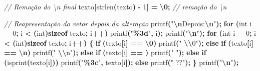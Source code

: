 \documentclass[
  11pt,
  a4paper,
]{scrbook}
\newenvironment{Shaded}{\begin{snugshade}}{\end{snugshade}}
\newcommand{\CharTok}[1]{\textcolor[rgb]{0.31,0.60,0.02}{#1}}
\newcommand{\CommentTok}[1]{\textcolor[rgb]{0.56,0.35,0.01}{\textit{#1}}}
\newcommand{\ControlFlowTok}[1]{\textcolor[rgb]{0.13,0.29,0.53}{\textbf{#1}}}
\newcommand{\DataTypeTok}[1]{\textcolor[rgb]{0.13,0.29,0.53}{#1}}
\newcommand{\DecValTok}[1]{\textcolor[rgb]{0.00,0.00,0.81}{#1}}
\newcommand{\KeywordTok}[1]{\textcolor[rgb]{0.13,0.29,0.53}{\textbf{#1}}}
\newcommand{\NormalTok}[1]{#1}
\newcommand{\OperatorTok}[1]{\textcolor[rgb]{0.81,0.36,0.00}{\textbf{#1}}}
\newcommand{\SpecialCharTok}[1]{\textcolor[rgb]{0.81,0.36,0.00}{\textbf{#1}}}
\newcommand{\StringTok}[1]{\textcolor[rgb]{0.31,0.60,0.02}{#1}}
\begin{document}
\begin{Shaded}
\begin{Highlighting}[]
    \CommentTok{// Remoção do \textbackslash{}n final}
\NormalTok{    texto}\OperatorTok{[}\NormalTok{strlen}\OperatorTok{(}\NormalTok{texto}\OperatorTok{)} \OperatorTok{{-}} \DecValTok{1}\OperatorTok{]} \OperatorTok{=} \CharTok{\textquotesingle{}}\SpecialCharTok{\textbackslash{}0}\CharTok{\textquotesingle{}}\OperatorTok{;}  \CommentTok{// remoção do \textbackslash{}n}

    \CommentTok{// Reapresentação do vetor depois da alteração}
\NormalTok{    printf}\OperatorTok{(}\StringTok{"}\SpecialCharTok{\textbackslash{}n}\StringTok{Depois:}\SpecialCharTok{\textbackslash{}n}\StringTok{"}\OperatorTok{);}
    \ControlFlowTok{for} \OperatorTok{(}\DataTypeTok{int}\NormalTok{ i }\OperatorTok{=} \DecValTok{0}\OperatorTok{;}\NormalTok{ i }\OperatorTok{\textless{}} \OperatorTok{(}\DataTypeTok{int}\OperatorTok{)}\KeywordTok{sizeof}\NormalTok{ texto}\OperatorTok{;}\NormalTok{ i}\OperatorTok{++)}
\NormalTok{        printf}\OperatorTok{(}\StringTok{"}\SpecialCharTok{\%3d}\StringTok{"}\OperatorTok{,}\NormalTok{ i}\OperatorTok{);}
\NormalTok{    printf}\OperatorTok{(}\StringTok{"}\SpecialCharTok{\textbackslash{}n}\StringTok{"}\OperatorTok{);}
    \ControlFlowTok{for} \OperatorTok{(}\DataTypeTok{int}\NormalTok{ i }\OperatorTok{=} \DecValTok{0}\OperatorTok{;}\NormalTok{ i }\OperatorTok{\textless{}} \OperatorTok{(}\DataTypeTok{int}\OperatorTok{)}\KeywordTok{sizeof}\NormalTok{ texto}\OperatorTok{;}\NormalTok{ i}\OperatorTok{++)} \OperatorTok{\{}
        \ControlFlowTok{if} \OperatorTok{(}\NormalTok{texto}\OperatorTok{[}\NormalTok{i}\OperatorTok{]} \OperatorTok{==} \CharTok{\textquotesingle{}}\SpecialCharTok{\textbackslash{}0}\CharTok{\textquotesingle{}}\OperatorTok{)}
\NormalTok{            printf}\OperatorTok{(}\StringTok{" }\SpecialCharTok{\textbackslash{}\textbackslash{}}\StringTok{0"}\OperatorTok{);}
        \ControlFlowTok{else} \ControlFlowTok{if} \OperatorTok{(}\NormalTok{texto}\OperatorTok{[}\NormalTok{i}\OperatorTok{]} \OperatorTok{==} \CharTok{\textquotesingle{}}\SpecialCharTok{\textbackslash{}n}\CharTok{\textquotesingle{}}\OperatorTok{)}
\NormalTok{            printf}\OperatorTok{(}\StringTok{" }\SpecialCharTok{\textbackslash{}\textbackslash{}}\StringTok{n"}\OperatorTok{);}
        \ControlFlowTok{else} \ControlFlowTok{if} \OperatorTok{(}\NormalTok{texto}\OperatorTok{[}\NormalTok{i}\OperatorTok{]} \OperatorTok{==} \CharTok{\textquotesingle{} \textquotesingle{}}\OperatorTok{)}
\NormalTok{            printf}\OperatorTok{(}\StringTok{"   "}\OperatorTok{);}
        \ControlFlowTok{else} \ControlFlowTok{if} \OperatorTok{(}\NormalTok{isprint}\OperatorTok{(}\NormalTok{texto}\OperatorTok{[}\NormalTok{i}\OperatorTok{]))}
\NormalTok{            printf}\OperatorTok{(}\StringTok{"}\SpecialCharTok{\%3c}\StringTok{"}\OperatorTok{,}\NormalTok{ texto}\OperatorTok{[}\NormalTok{i}\OperatorTok{]);}
        \ControlFlowTok{else}
\NormalTok{            printf}\OperatorTok{(}\StringTok{" ??"}\OperatorTok{);}
    \OperatorTok{\}}
\NormalTok{    printf}\OperatorTok{(}\StringTok{"}\SpecialCharTok{\textbackslash{}n}\StringTok{"}\OperatorTok{);}


\end{Highlighting}
\end{Shaded}
\end{document}
